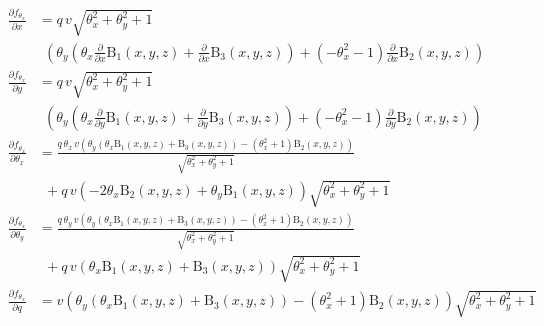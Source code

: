     \begin{align}
        \frac{\partial f_{\theta_x}}{\partial x} &= 
        q\, v \sqrt{\theta_{x}^{2} + \theta_{y}^{2} + 1} \nonumber\\ 
        &~~\left(\theta_{y} \left(\theta_{x} \frac{\partial}{\partial x} \operatorname{B_{1}}{\left (x,y,z \right)} + \frac{\partial}{\partial x} \operatorname{B_{3}}{\left (x,y,z \right )}\right) + \left(- \theta_{x}^{2} - 1\right) \frac{\partial}{\partial x} \operatorname{B_{2}}{\left (x,y,z \right )}\right) \label{eq:tf_dtx_dx}\\
        \frac{\partial f_{\theta_x}}{\partial y} &=
        q\, v \sqrt{\theta_{x}^{2} + \theta_{y}^{2} + 1} \nonumber\\
        &~~\left(\theta_{y} \left(\theta_{x} \frac{\partial}{\partial y} \operatorname{B_{1}}{\left (x,y,z \right )} + \frac{\partial}{\partial y} \operatorname{B_{3}}{\left (x,y,z \right )}\right) + \left(- \theta_{x}^{2} - 1\right) \frac{\partial}{\partial y} \operatorname{B_{2}}{\left (x,y,z \right )}\right) \label{eq:tf_dtx_dy}\\
        \frac{\partial f_{\theta_x}}{\partial \theta_x} &=
        \frac{q\, \theta_{x}\, v \left(\theta_{y} \left(\theta_{x} \operatorname{B_{1}}{\left (x,y,z \right )} + \operatorname{B_{3}}{\left (x,y,z \right )}\right) - \left(\theta_{x}^{2} + 1\right) \operatorname{B_{2}}{\left (x,y,z \right )}\right)}{\sqrt{\theta_{x}^{2} + \theta_{y}^{2} + 1}} \nonumber\\
        &~~ + q\, v \left(- 2 \theta_{x} \operatorname{B_{2}}{\left (x,y,z \right )} + \theta_{y} \operatorname{B_{1}}{\left (x,y,z \right )}\right) \sqrt{\theta_{x}^{2} + \theta_{y}^{2} + 1} \nonumber\\
        \frac{\partial f_{\theta_x}}{\partial \theta_y} &=
        \frac{q\, \theta_{y}\, v \left(\theta_{y} \left(\theta_{x} \operatorname{B_{1}}{\left (x,y,z \right )} + \operatorname{B_{3}}{\left (x,y,z \right )}\right) - \left(\theta_{x}^{2} + 1\right) \operatorname{B_{2}}{\left (x,y,z \right )}\right)}{\sqrt{\theta_{x}^{2} + \theta_{y}^{2} + 1}} \nonumber\\
        &~~ + q\, v \left(\theta_{x} \operatorname{B_{1}}{\left (x,y,z \right )} + \operatorname{B_{3}}{\left (x,y,z \right )}\right) \sqrt{\theta_{x}^{2} + \theta_{y}^{2} + 1} \nonumber\\
        \frac{\partial f_{\theta_x}}{\partial q} &=
        v \left(\theta_{y} \left(\theta_{x} \operatorname{B_{1}}{\left (x,y,z \right )} + \operatorname{B_{3}}{\left (x,y,z \right )}\right) - \left(\theta_{x}^{2} + 1\right) \operatorname{B_{2}}{\left (x,y,z \right )}\right) \sqrt{\theta_{x}^{2} + \theta_{y}^{2} + 1} \nonumber
    \end{align}
